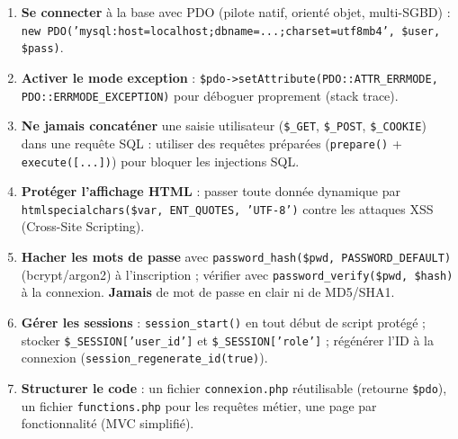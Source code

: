 \documentclass[11pt]{article}
\newcommand{\cle}[1]{{\popxbold\color{popdark}#1}}
\begin{document}
\begin{methode}
\begin{enumerate}
\item \textbf{Se connecter} à la base avec PDO (pilote natif, orienté objet, multi-SGBD) : \texttt{new PDO('mysql:host=localhost;dbname=...;charset=utf8mb4', \$user, \$pass)}.
\item \textbf{Activer le mode exception} : \texttt{\$pdo->setAttribute(PDO::ATTR\_ERRMODE, PDO::ERRMODE\_EXCEPTION)} pour déboguer proprement (stack trace).
\item \textbf{Ne jamais concaténer} une saisie utilisateur (\texttt{\$\_GET}, \texttt{\$\_POST}, \texttt{\$\_COOKIE}) dans une requête SQL : utiliser des \cle{requêtes préparées} (\texttt{prepare()} + \texttt{execute([...])}) pour bloquer les injections SQL.
\item \textbf{Protéger l'affichage HTML} : passer toute donnée dynamique par \texttt{htmlspecialchars(\$var, ENT\_QUOTES, 'UTF-8')} contre les attaques XSS (Cross-Site Scripting).
\item \textbf{Hacher les mots de passe} avec \texttt{password\_hash(\$pwd, PASSWORD\_DEFAULT)} (bcrypt/argon2) à l'inscription ; vérifier avec \texttt{password\_verify(\$pwd, \$hash)} à la connexion. \textbf{Jamais} de mot de passe en clair ni de MD5/SHA1.
\item \textbf{Gérer les sessions} : \texttt{session\_start()} en tout début de script protégé ; stocker \texttt{\$\_SESSION['user\_id']} et \texttt{\$\_SESSION['role']} ; régénérer l'ID à la connexion (\texttt{session\_regenerate\_id(true)}).
\item \textbf{Structurer le code} : un fichier \texttt{connexion.php} réutilisable (retourne \texttt{\$pdo}), un fichier \texttt{functions.php} pour les requêtes métier, une page par fonctionnalité (MVC simplifié).
\end{enumerate}
\end{methode}
\end{document}

